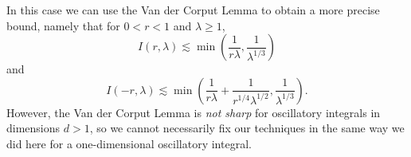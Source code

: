 \documentclass[12pt]{article}
\theoremstyle{definition}
\theoremstyle{remark}
\numberwithin{equation}{section}
\begin{document}
	In this case we can use the Van der Corput Lemma to obtain a more precise bound, namely that for $0 < r < 1$ and $\lambda \geq 1$,
	\[ I(r,\lambda) \lesssim \min \left( \frac{1}{r\lambda}, \frac{1}{\lambda^{1/3}} \right) \]
	and
	\[ I(-r,\lambda) \lesssim \min \left( \frac{1}{r\lambda} + \frac{1}{r^{1/4} \lambda^{1/2}}, \frac{1}{\lambda^{1/3}} \right). \]
	However, the Van der Corput Lemma is \emph{not sharp} for oscillatory integrals in dimensions $d > 1$, so we cannot necessarily fix our techniques in the same way we did here for a one-dimensional oscillatory integral.
\end{document}
